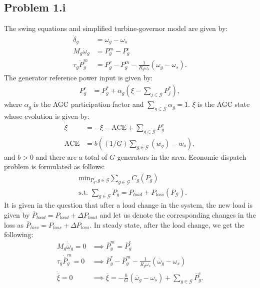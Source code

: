\subsection*{Problem 1.i}
The swing equations and simplified turbine-governor model are given by:
\begin{align}\label{eq:q1_swing}
	\dot{\delta}_g &= \omega_g-\omega_s \nonumber\\
	M_g\dot{\omega}_g &= P_g^m-P_g^e \nonumber \\
	\tau_g\dot{P}_g^m &= P_g^r-P_g^m - \frac{1}{R_g\omega_s}(\omega_g-\omega_s).
\end{align}
The generator reference power input is given by:
\begin{align}\label{eq:q1_gen_ref}
	P_g^r &= P_g^*+\alpha_g\left(\xi - \sum_{j\in \mathcal{G}}P_j^*\right),
\end{align}
where $\alpha_g$ is the AGC participation factor and $\sum_{g \in \mathcal{G}}\alpha_g=1$. $\xi$ is the AGC state whose evolution is given by:
\begin{align*}
	\dot{\xi} &= -\xi-\text{ACE}+\sum_{g\in \mathcal{G}}P_g^e\\
	\text{ACE} &= b\left((1/G)\sum_{g \in \mathcal{G}}(w_g) - w_s\right),
\end{align*}
and $b > 0$ and there are a total of $G$ generators in the area. Economic dispatch problem is formulated as follows:
\begin{align}
	&\text{min}_{P_g, g \in \mathcal{G}} \sum_{g\in \mathcal{G}}C_g(P_g) \nonumber\\
	&\text{s.t. } \sum_{g \in \mathcal{G}}P_g = P_{load} + P_{loss}(P_{\mathcal{G}}).
\end{align}
It is given in the question that after a load change in the system, the new load is given by $\overline{P}_{load} = P_{load}+\Delta P_{load}$ and let us denote the corresponding changes in the loss as $\overline{P}_{loss} = P_{loss}+\Delta P_{loss}$. In steady state, after the load change, we get the following:
\begin{align}\label{eq:q1_ss}
	M_g \dot{\overline{\omega}}_g = 0 & \implies \overline{P}^m_g = \overline{P}^e_g \nonumber\\
	\tau_g \dot{\overline{P}}_g^m = 0 & \implies \overline{P}^r_g - \overline{P}^m_g - \frac{1}{R_g \omega_s}(\overline{\omega}_g-\omega_s) \nonumber\\
	\dot{\overline{\xi}} = 0 & \implies \overline{\xi} = -\frac{b}{G}(\overline{\omega}_g - \omega_s) + \sum_{g \in \mathcal{G}}\overline{P}_g^e.
\end{align}
